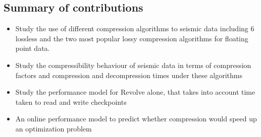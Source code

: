 \subsection{Summary of contributions}
\begin{itemize}
\item Study the use of different compression algorithms to seismic
  data including 6 lossless and the two most popular lossy compression
  algorithms for floating point data. 
\item Study the compressibility behaviour of seismic data in terms of
  compression factors and compression and decompression times under
  these algorithms
\item Study the performance model for Revolve alone, that takes into
  account time taken to read and write checkpoints
\item An online performance model to predict whether compression would speed up
  an optimization problem
\end{itemize}
